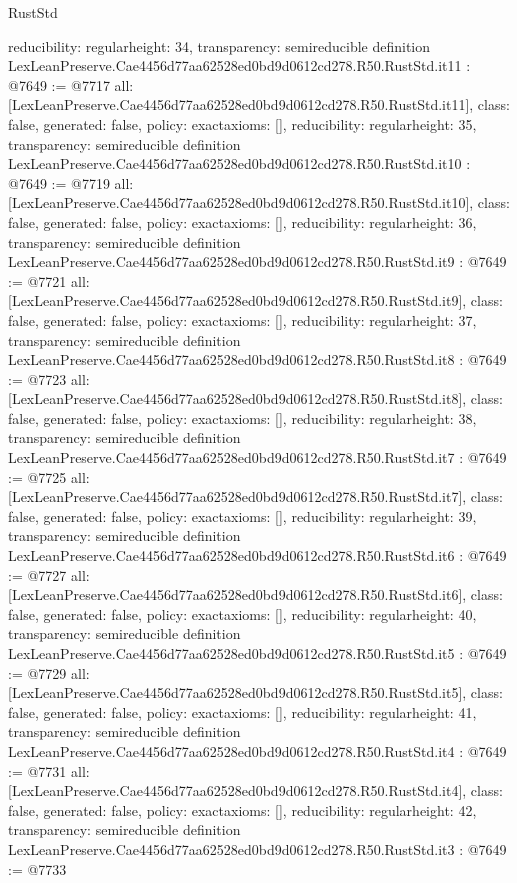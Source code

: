 \begin{lexlean}{RustStd}
\begin{coremodule}
{  reducibility: regular{height: 34},
  transparency: semireducible
}
definition LexLeanPreserve.Cae4456d77aa62528ed0bd9d0612cd278.R50.RustStd.it11 : @7649 := @7717 {
  all: [LexLeanPreserve.Cae4456d77aa62528ed0bd9d0612cd278.R50.RustStd.it11],
  class: false,
  generated: false,
  policy: exact{axioms: []},
  reducibility: regular{height: 35},
  transparency: semireducible
}
definition LexLeanPreserve.Cae4456d77aa62528ed0bd9d0612cd278.R50.RustStd.it10 : @7649 := @7719 {
  all: [LexLeanPreserve.Cae4456d77aa62528ed0bd9d0612cd278.R50.RustStd.it10],
  class: false,
  generated: false,
  policy: exact{axioms: []},
  reducibility: regular{height: 36},
  transparency: semireducible
}
definition LexLeanPreserve.Cae4456d77aa62528ed0bd9d0612cd278.R50.RustStd.it9 : @7649 := @7721 {
  all: [LexLeanPreserve.Cae4456d77aa62528ed0bd9d0612cd278.R50.RustStd.it9],
  class: false,
  generated: false,
  policy: exact{axioms: []},
  reducibility: regular{height: 37},
  transparency: semireducible
}
definition LexLeanPreserve.Cae4456d77aa62528ed0bd9d0612cd278.R50.RustStd.it8 : @7649 := @7723 {
  all: [LexLeanPreserve.Cae4456d77aa62528ed0bd9d0612cd278.R50.RustStd.it8],
  class: false,
  generated: false,
  policy: exact{axioms: []},
  reducibility: regular{height: 38},
  transparency: semireducible
}
definition LexLeanPreserve.Cae4456d77aa62528ed0bd9d0612cd278.R50.RustStd.it7 : @7649 := @7725 {
  all: [LexLeanPreserve.Cae4456d77aa62528ed0bd9d0612cd278.R50.RustStd.it7],
  class: false,
  generated: false,
  policy: exact{axioms: []},
  reducibility: regular{height: 39},
  transparency: semireducible
}
definition LexLeanPreserve.Cae4456d77aa62528ed0bd9d0612cd278.R50.RustStd.it6 : @7649 := @7727 {
  all: [LexLeanPreserve.Cae4456d77aa62528ed0bd9d0612cd278.R50.RustStd.it6],
  class: false,
  generated: false,
  policy: exact{axioms: []},
  reducibility: regular{height: 40},
  transparency: semireducible
}
definition LexLeanPreserve.Cae4456d77aa62528ed0bd9d0612cd278.R50.RustStd.it5 : @7649 := @7729 {
  all: [LexLeanPreserve.Cae4456d77aa62528ed0bd9d0612cd278.R50.RustStd.it5],
  class: false,
  generated: false,
  policy: exact{axioms: []},
  reducibility: regular{height: 41},
  transparency: semireducible
}
definition LexLeanPreserve.Cae4456d77aa62528ed0bd9d0612cd278.R50.RustStd.it4 : @7649 := @7731 {
  all: [LexLeanPreserve.Cae4456d77aa62528ed0bd9d0612cd278.R50.RustStd.it4],
  class: false,
  generated: false,
  policy: exact{axioms: []},
  reducibility: regular{height: 42},
  transparency: semireducible
}
definition LexLeanPreserve.Cae4456d77aa62528ed0bd9d0612cd278.R50.RustStd.it3 : @7649 := @7733 {
}
\end{coremodule}
\end{lexlean}
